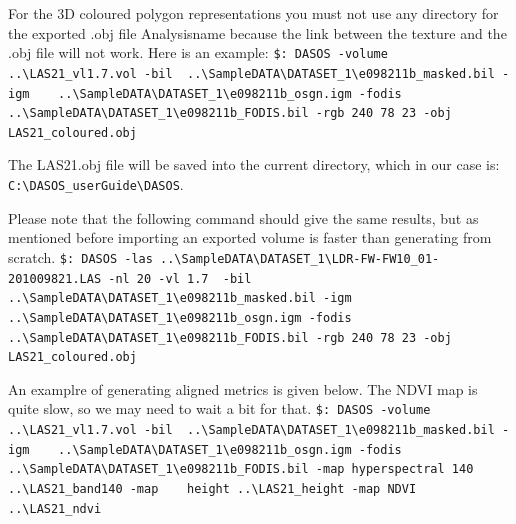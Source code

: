 \documentclass{article}
\begin{document}
	   \par For the 3D coloured polygon representations you must not use any directory for the exported .obj file Analysisname because the link between the texture and the .obj file will not work. Here is an example:\newline
	    \verb|$: DASOS -volume ..\LAS21_vl1.7.vol -bil |\newline \verb| ..\SampleDATA\DATASET_1\e098211b_masked.bil -igm |\newline \verb|   ..\SampleDATA\DATASET_1\e098211b_osgn.igm -fodis |\newline \verb|   ..\SampleDATA\DATASET_1\e098211b_FODIS.bil -rgb 240 78 23 -obj |\newline \verb|   LAS21_coloured.obj|\par 
	    \par The LAS21.obj file will be saved into the current directory, which in our case is: \newline \verb|C:\DASOS_userGuide\DASOS|. 
	    \par Please note that the following command should give the same results, but as mentioned before importing an exported volume is faster than generating from scratch. \newline
	    \verb|$: DASOS -las ..\SampleDATA\DATASET_1\LDR-FW-FW10_01-201009821.LAS -nl 20 -vl 1.7 |\newline \verb| -bil    ..\SampleDATA\DATASET_1\e098211b_masked.bil -igm  |\newline \verb|   ..\SampleDATA\DATASET_1\e098211b_osgn.igm -fodis |\newline \verb|   ..\SampleDATA\DATASET_1\e098211b_FODIS.bil -rgb 240 78 23 -obj |\newline \verb| LAS21_coloured.obj|
	    
	    \par An examplre of generating aligned metrics is given below. The NDVI map is quite slow, so we may need to wait a bit for that.\newline
	    \verb|$: DASOS -volume ..\LAS21_vl1.7.vol -bil |\newline \verb| ..\SampleDATA\DATASET_1\e098211b_masked.bil -igm |\newline \verb|   ..\SampleDATA\DATASET_1\e098211b_osgn.igm -fodis |\newline \verb|   ..\SampleDATA\DATASET_1\e098211b_FODIS.bil -map hyperspectral 140 |\newline \verb|..\LAS21_band140 -map    height ..\LAS21_height -map NDVI ..\LAS21_ndvi|
	    
\end{document}
